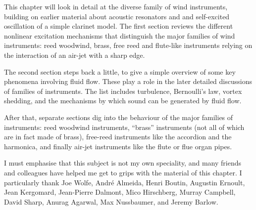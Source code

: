   This chapter will look in detail at the diverse family of wind instruments, 
  building on earlier material about acoustic resonators and and self-excited 
  oscillation of a simple clarinet model. The first section reviews the 
  different nonlinear excitation mechanisms that distinguish the major families 
  of wind instruments: reed woodwind, brass, free reed and flute-like 
  instruments relying on the interaction of an air-jet with a sharp edge. 

  The second section steps back a little, to give a simple overview of some key 
  phenomena involving fluid flow. These play a role in the later detailed 
  discussions of families of instruments. The list includes turbulence, 
  Bernoulli’s law, vortex shedding, and the mechanisms by which sound can be 
  generated by fluid flow. 

  After that, separate sections dig into the behaviour of the major families of 
  instruments: reed woodwind instruments, “brass” instruments (not all of which 
  are in fact made of brass), free-reed instruments like the accordion and the 
  harmonica, and finally air-jet instruments like the flute or flue organ 
  pipes. 

  I must emphasise that this subject is not my own speciality, and many friends 
  and colleagues have helped me get to grips with the material of this chapter. 
  I particularly thank Joe Wolfe, André Almeida, Henri Boutin, Augustin 
  Ernoult, Jean Kergomard, Jean-Pierre Dalmont, Mico Hirschberg, Murray 
  Campbell, David Sharp, Anurag Agarwal, Max Nussbaumer, and Jeremy Barlow. 

